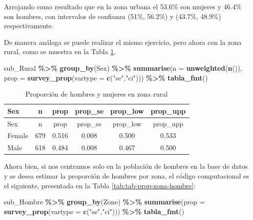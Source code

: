\documentclass[
  spanish,
  12pt,
]{book}
\newenvironment{Shaded}{\begin{snugshade}}{\end{snugshade}}
\newcommand{\AttributeTok}[1]{\textcolor[rgb]{0.13,0.29,0.53}{#1}}
\newcommand{\FunctionTok}[1]{\textcolor[rgb]{0.13,0.29,0.53}{\textbf{#1}}}
\newcommand{\NormalTok}[1]{#1}
\newcommand{\SpecialCharTok}[1]{\textcolor[rgb]{0.81,0.36,0.00}{\textbf{#1}}}
\newcommand{\StringTok}[1]{\textcolor[rgb]{0.31,0.60,0.02}{#1}}
\begin{document}
Arrojando como resultado que en la zona urbana el 53.6\% son mujeres y 46.4\% son hombres, con intervalos de confianza (51\%, 56.2\%) y (43.7\%, 48.9\%) respectivamente.

De manera análoga se puede realizar el mismo ejercicio, pero ahora con la zona rural, como se muestra en la Tabla \ref{tab:tab-prop-sexo-rural}.

\begin{Shaded}
\begin{Highlighting}[]
\NormalTok{sub\_Rural }\SpecialCharTok{\%\textgreater{}\%} 
  \FunctionTok{group\_by}\NormalTok{(Sex) }\SpecialCharTok{\%\textgreater{}\%} 
  \FunctionTok{summarise}\NormalTok{(}\AttributeTok{n    =} \FunctionTok{unweighted}\NormalTok{(}\FunctionTok{n}\NormalTok{()),}
            \AttributeTok{prop =} \FunctionTok{survey\_prop}\NormalTok{(}\AttributeTok{vartype =} \FunctionTok{c}\NormalTok{(}\StringTok{"se"}\NormalTok{,}\StringTok{"ci"}\NormalTok{))) }\SpecialCharTok{\%\textgreater{}\%}
  \FunctionTok{tabla\_fmt}\NormalTok{()}
\end{Highlighting}
\end{Shaded}

\begin{longtable}[]{@{}lccccc@{}}
\caption{\label{tab:tab-prop-sexo-rural}Proporción de hombres y mujeres en zona rural}\tabularnewline
\toprule\noalign{}
Sex & n & prop & prop\_se & prop\_low & prop\_upp \\
\midrule\noalign{}
\endfirsthead
\toprule\noalign{}
Sex & n & prop & prop\_se & prop\_low & prop\_upp \\
\midrule\noalign{}
\endhead
\bottomrule\noalign{}
\endlastfoot
Female & 679 & 0.516 & 0.008 & 0.500 & 0.533 \\
Male & 618 & 0.484 & 0.008 & 0.467 & 0.500 \\
\end{longtable}

Ahora bien, si nos centramos solo en la población de hombres en la base de datos y se desea estimar la proporción de hombres por zona, el código computacional es el siguiente, presentada en la Tabla \ref{tab:tab-prop-zona-hombre}:

\begin{Shaded}
\begin{Highlighting}[]
\NormalTok{sub\_Hombre }\SpecialCharTok{\%\textgreater{}\%} 
  \FunctionTok{group\_by}\NormalTok{(Zone) }\SpecialCharTok{\%\textgreater{}\%} 
  \FunctionTok{summarise}\NormalTok{(}\AttributeTok{prop =} \FunctionTok{survey\_prop}\NormalTok{(}\AttributeTok{vartype =} \FunctionTok{c}\NormalTok{(}\StringTok{"se"}\NormalTok{,}\StringTok{"ci"}\NormalTok{))) }\SpecialCharTok{\%\textgreater{}\%}
  \FunctionTok{tabla\_fmt}\NormalTok{()}
\end{Highlighting}
\end{Shaded}
\end{document}
